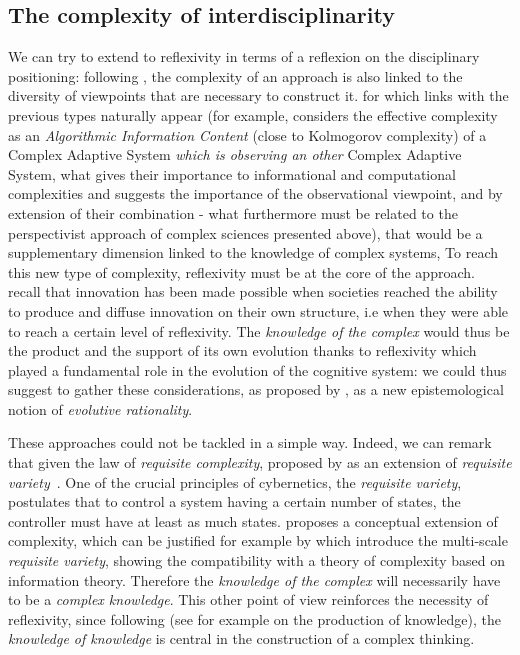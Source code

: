 \subsection{The complexity of interdisciplinarity}


We can try to extend to reflexivity in terms of a reflexion on the disciplinary positioning: following \cite{pumain2005cumulativite}, the complexity of an approach is also linked to the diversity of viewpoints that are necessary to construct it.  for which links with the previous types naturally appear (for example, \cite{gell1995quark} considers the effective complexity as an \emph{Algorithmic Information Content} (close to Kolmogorov complexity) of a Complex Adaptive System \emph{which is observing an other} Complex Adaptive System, what gives their importance to informational and computational complexities and suggests the importance of the observational viewpoint, and by extension of their combination - what furthermore must be related to the perspectivist approach of complex sciences presented above), that would be a supplementary dimension linked to the knowledge of complex systems,
To reach this new type of complexity, reflexivity must be at the core of the approach. \cite{read2009innovation} recall that innovation has been made possible when societies reached the ability to produce and diffuse innovation on their own structure, i.e when they were able to reach a certain level of reflexivity. The \emph{knowledge of the complex} would thus be the product and the support of its own evolution thanks to reflexivity which played a fundamental role in the evolution of the cognitive system: we could thus suggest to gather these considerations, as proposed by , as a new epistemological notion of \emph{evolutive rationality}.


These approaches could not be tackled in a simple way. Indeed, we can remark that given the law of \emph{requisite complexity}, proposed by \cite{gershenson2015requisite} as an extension of \emph{requisite variety}~\cite{ashby1991requisite}. One of the crucial principles of cybernetics, the \emph{requisite variety}, postulates that to control a system having a certain number of states, the controller must have at least as much states.  proposes a conceptual extension of complexity, which can be justified for example by \cite{allen2017multiscale} which introduce the multi-scale \emph{requisite variety}, showing the compatibility with a theory of complexity based on information theory. Therefore the \emph{knowledge of the complex} will necessarily have to be a \emph{complex knowledge}. This other point of view reinforces the necessity of reflexivity, since following  (see for example \cite{morin1991methode} on the production of knowledge), the \emph{knowledge of knowledge} is central in the construction of a complex thinking.



